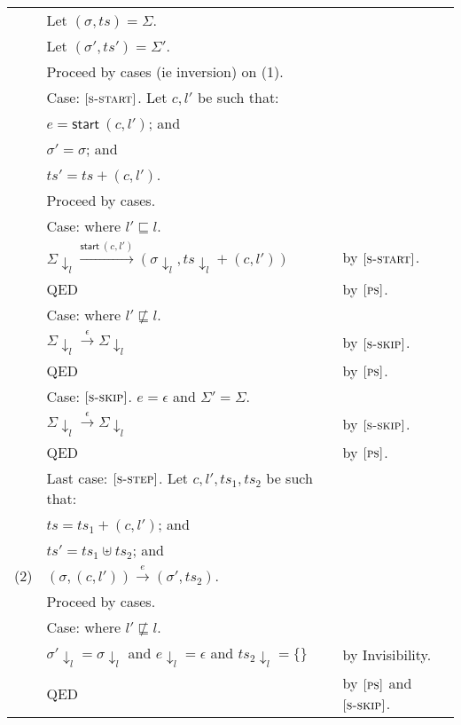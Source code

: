 \documentclass{article}
\newcommand{\rn}[1]{\text{\textsc{[#1]}}}
\newcommand{\tsteparrow}[1]{\overset{#1}{\longrightarrow}}
\newcommand{\tstep}[3]{#2\tsteparrow{#1}#3}
\newcommand{\ssteparrow}[1]{\overset{#1}{\longrightarrow}}
\newcommand{\sstep}[3]{#2\ssteparrow{#1}#3}
\newcommand{\thread}[2]{(#1,#2)}
\newcommand{\evstart}[1]{\textsf{start}~#1}
\newcommand{\proj}[2]{#1{\downarrow_{#2}}}
\begin{document}
\begin{tabular}{l@{$\qquad$}l@{$\qquad$}l}
        & Let $(\sigma, ts) = \Sigma$.
\\
        & Let $(\sigma', ts') = \Sigma'$.
\\
        & Proceed by cases (ie inversion) on (1).
\\
        & Case: $\rn{s-start}$. Let $c,l'$ be such that:
\\
        & \z $e=\evstart{\thread{c}{l'}}$; and
\\
        & \z $\sigma'=\sigma$; and
\\
        & \z $ts'=ts+\thread{c}{l'}$.
\\
        & \z Proceed by cases.
\\
        & \z Case: where $l'\sqsubseteq l$.
\\
        & \z \z $\sstep{\evstart{\thread{c}{l'}}}{\proj{\Sigma}{l}}{(\proj{\sigma}{l},\proj{ts}{l}+\thread{c}{l'})}$
        & by  $\rn{s-start}$.
\\
        & \z \z QED
        & by  $\rn{ps}$.
\\
       & \z Case: where $l'\not\sqsubseteq l$.
\\
        & \z \z $\sstep{\epsilon}{\proj{\Sigma}{l}}{\proj{\Sigma}{l}}$
        & by  $\rn{s-skip}$.
\\
        & \z \z QED
        & by  $\rn{ps}$.
\\
        & Case: $\rn{s-skip}$. $e=\epsilon$ and $\Sigma'=\Sigma$.
\\
        & \z $\sstep{\epsilon}{\proj{\Sigma}{l}}{\proj{\Sigma}{l}}$
        & by  $\rn{s-skip}$.
\\
        & \z QED
        & by  $\rn{ps}$.
\\
        & Last case: $\rn{s-step}$. Let $c,l',ts_1,ts_2$ be such that:
\\
        & $ts=ts_1+\thread{c}{l'}$; and
\\
        & $ts'=ts_1\uplus ts_2$; and
\\
  (2)   & $\tstep{e}{(\sigma,\thread{c}{l'})}{(\sigma',ts_2)}$.
\\
        & Proceed by cases.
\\
        & Case: where $l'\not\sqsubseteq l$.
\\
        & \z $\proj{\sigma'}{l}=\proj{\sigma}{l}$ and $\proj{e}{l}=\epsilon$ and $\proj{ts_2}{l}=\{\}$
        & by Invisibility.
\\
        & \z QED
        & by  $\rn{ps}$ and $\rn{s-skip}$.
\\

\end{tabular}
\end{document}
